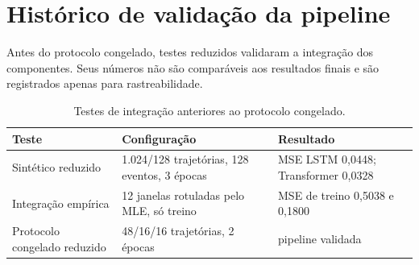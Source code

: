 \documentclass[12pt,a4paper,openany]{report}
\begin{document}
\chapter{Histórico de validação da pipeline}

Antes do protocolo congelado, testes reduzidos validaram a integração dos componentes.
Seus números não são comparáveis aos resultados finais e são registrados apenas para
rastreabilidade.

\begin{table}[htbp]
\centering
\caption{Testes de integração anteriores ao protocolo congelado.}
\label{tab:historico}
\small
\begin{tabularx}{\linewidth}{lXX}
\toprule
Teste & Configuração & Resultado\\
\midrule
Sintético reduzido & 1.024/128 trajetórias, 128 eventos, 3 épocas &
  MSE LSTM 0,0448; Transformer 0,0328\\
Integração empírica & 12 janelas rotuladas pelo MLE, só treino &
  MSE de treino 0,5038 e 0,1800\\
Protocolo congelado reduzido & 48/16/16 trajetórias, 2 épocas & pipeline validada\\
\bottomrule
\end{tabularx}
\end{table}



\end{document}

